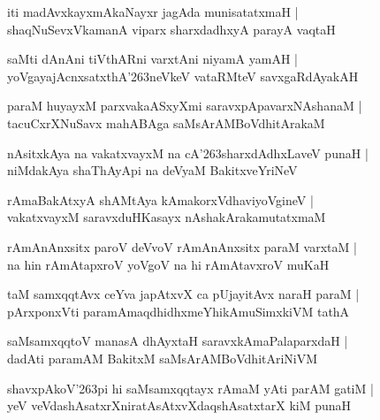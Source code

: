 \documentclass[twoside,12pt,openright]{book}
\def\S{\char'263}
\newcounter{shloka}[chapter]
\begin{document}
\begin{shloka}%
iti madAvxkayxmAkaNayxr jagAda munisatatxmaH |\\
shaqNuSevxVkamanA viparx sharxdadhxyA parayA vaqtaH 
\end{shloka}

\begin{shloka}%
saMti dAnAni tiVthARni varxtAni niyamA yamAH |\\
yoVgayajAcnxsatxthA\S neVkeV vataRMteV savxgaRdAyakAH 
\end{shloka}

\begin{shloka}%
paraM huyayxM parxvakaASxyXmi saravxpApavarxNAshanaM |\\
tacuCxrXNuSavx mahABAga saMsArAMBoVdhitArakaM 
\end{shloka}

\begin{shloka}%
nAsitxkAya na vakatxvayxM na cA\S sharxdAdhxLaveV punaH |\\
niMdakAya shaThAyApi na deVyaM BakitxveYriNeV 
\end{shloka}

\begin{shloka}%
rAmaBakAtxyA shAMtAya kAmakorxVdhaviyoVgineV |\\
vakatxvayxM saravxduHKasayx nAshakArakamutatxmaM 
\end{shloka}

\begin{shloka}%
rAmAnAnxsitx paroV deVvoV rAmAnAnxsitx paraM varxtaM |\\
na hin rAmAtapxroV yoVgoV na hi rAmAtavxroV muKaH
\end{shloka}

\begin{shloka}%
taM samxqqtAvx ceYva japAtxvX ca pUjayitAvx naraH paraM |\\
pArxponxVti paramAmaqdhidhxmeYhikAmuSimxkiVM tathA 
\end{shloka}

\begin{shloka}%
saMsamxqqtoV manasA dhAyxtaH saravxkAmaPalaparxdaH |\\
dadAti paramAM BakitxM saMsArAMBoVdhitAriNiVM 
\end{shloka}

\begin{shloka}%
shavxpAkoV\S pi hi saMsamxqqtayx rAmaM yAti parAM gatiM |\\
yeV veVdashAsatxrXniratAsAtxvXdaqshAsatxtarX kiM punaH 
\end{shloka}
\end{document}
